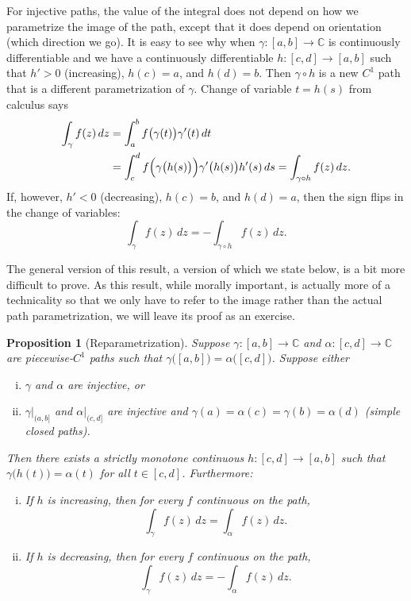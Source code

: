 \documentclass[12pt,openany]{book}
\newcommand{\C}{{\mathbb{C}}}
\theoremstyle{plain}
\newtheorem{prop}[thm]{Proposition}
\theoremstyle{remark}
\theoremstyle{definition}
\theoremstyle{exercise}
\theoremstyle{example}
\begin{document}
For injective paths, the value of the integral does not depend on how
we parametrize the image of the path,
except that it does depend on orientation (which direction we go).
It is easy to see why when
$\gamma \colon [a,b] \to \C$ is continuously differentiable and we have
a continuously differentiable $h \colon [c,d] \to [a,b]$ such
that $h' > 0$ (increasing), $h(c)=a$, and $h(d) = b$.  Then $\gamma \circ h$ is a new
$C^1$ path that is a different parametrization of $\gamma$.
Change of variable $t=h(s)$ from calculus says
\begin{equation*}
\begin{split}
\int_{\gamma} f(z) \, dz
& =
\int_a^b f\bigl( \gamma(t) \bigr) \gamma'(t) \, dt
\\
& =
\int_c^d f\Bigl( \gamma\bigl(h(s)\bigr) \Bigr) \gamma'\bigl(h(s)\bigr) h'(s) \, ds
=
\int_{\gamma \circ h} f(z) \, dz.
\end{split}
\end{equation*}
If, however, $h' < 0$ (decreasing), $h(c)=b$, and $h(d)=a$, then the
sign flips in the change of variables:
\begin{equation*}
\int_{\gamma} f(z) \, dz =
- \int_{\gamma \circ h} f(z) \, dz.
\end{equation*}

The general version of this result, a version of which we state below,
is a bit more difficult to prove.
As this result, while
morally important, is actually more of a technicality so that we only have
to refer to the image rather than the actual path parametrization, we will
leave its proof as an exercise.

\begin{prop}[Reparametrization]%
\label{prop:reparam}
Suppose $\gamma \colon [a,b] \to \C$ and $\alpha \colon [c,d] \to \C$ are
piecewise-$C^1$ paths such that
$\gamma\bigl([a,b]\bigr) = \alpha\bigl([c,d]\bigr)$.
Suppose either
\begin{enumerate}[(i)]
\item
$\gamma$ and $\alpha$ are injective, or
\item
$\gamma|_{(a,b]}$ and
$\alpha|_{(c,d]}$ are injective and 
$\gamma(a)=\alpha(c)=\gamma(b)=\alpha(d)$ (simple closed paths).
\end{enumerate}
Then there exists a strictly monotone continuous $h \colon [c,d] \to [a,b]$ such
that $\gamma\bigl(h(t)\bigr) = \alpha(t)$ for all $t \in [c,d]$.
Furthermore:
\begin{enumerate}[(i)]
\item
If $h$ is increasing, then for every $f$ continuous on the path,
\begin{equation*}
\int_\gamma f(z) \, dz = \int_{\alpha} f(z) \, dz .
\end{equation*}
\item
If $h$ is decreasing, then for every $f$ continuous on the path,
\begin{equation*}
\int_\gamma f(z) \, dz = - \int_{\alpha} f(z) \, dz .
\end{equation*}
\end{enumerate}
\end{prop}
\end{document}
